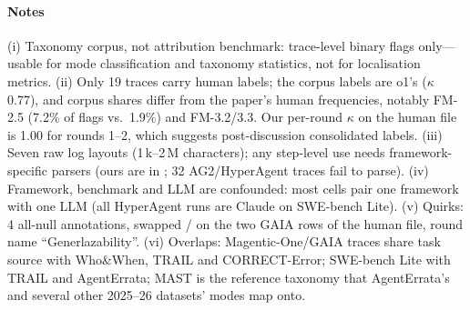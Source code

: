 \paragraph{Notes} (i) Taxonomy corpus, not attribution benchmark: trace-level binary flags only---usable for mode classification and taxonomy statistics, not for localisation metrics. (ii) Only 19 traces carry human labels; the corpus labels are o1's ($\kappa$ 0.77), and corpus shares differ from the paper's human frequencies, notably FM-2.5 (7.2\% of flags vs.\ 1.9\%) and FM-3.2/3.3. Our per-round $\kappa$ on the human file is 1.00 for rounds 1--2, which suggests post-discussion consolidated labels. (iii) Seven raw log layouts (1\,k--2\,M characters); any step-level use needs framework-specific parsers (ours are in ; 32 AG2/HyperAgent traces fail to parse). (iv) Framework, benchmark and LLM are confounded: most cells pair one framework with one LLM (all HyperAgent runs are Claude on SWE-bench Lite). (v) Quirks: 4 all-null annotations, swapped / on the two GAIA rows of the human file, round name ``Generlazability''. (vi) Overlaps: Magentic-One/GAIA traces share task source with Who\&When, TRAIL and CORRECT-Error; SWE-bench Lite with TRAIL and AgentErrata; MAST is the reference taxonomy that AgentErrata's and several other 2025--26 datasets' modes map onto.
